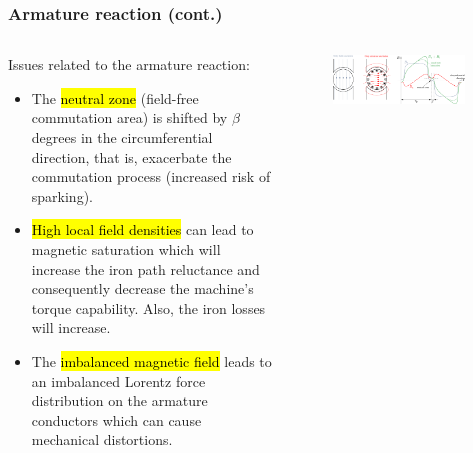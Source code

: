 \begin{frame}
	\frametitle{Armature reaction (cont.)}
	\begin{columns}
		\begin{column}{0.55\textwidth}
	Issues related to the armature reaction:
	\begin{itemize}
		\item The \hl{neutral zone} (field-free commutation area) is shifted by $\beta$ degrees in the circumferential direction, that is, exacerbate the commutation process (increased risk of sparking).
		\item<2-> \hl{High local field densities} can lead to magnetic saturation which will increase the iron path reluctance and consequently decrease the machine's torque capability. Also, the iron losses will increase. 
		\item<3-> The \hl{imbalanced magnetic field} leads to an imbalanced Lorentz force distribution on the armature conductors which can cause mechanical distortions. 
	\end{itemize}
\end{column}
\hfill
\begin{column}{0.45\textwidth}
	\begin{figure}
		\centering
		\includegraphics[trim={7.2cm 0 0 0}, clip, width=0.95\textwidth]{fig/lec03/Armature_reaction.pdf}
	\end{figure}
\end{column}
\end{columns}
\end{frame}

